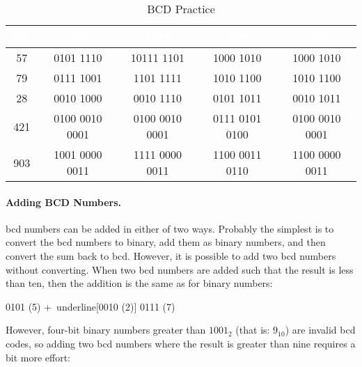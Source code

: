 \begin{table}[H]
  \sffamily
  \newcommand{\head}[1]{\textcolor{white}{\textbf{#1}}}    
  \begin{center}
    {\small         
      \begin{tabular}{ c c c c c } 
        \hline
        \rowcolor{black!75}
        {\head{Dec}} & {\head{8421}} & \head{2421} 
        & \head{Ex3} & \head{5421} \\
        \hline    
        57  & 0101 1110      & 10111 1101     
            & 1000 1010      & 1000 1010 \\
        79  & 0111 1001      & 1101 1111      
            & 1010 1100      & 1010 1100 \\
        
        28  & 0010 1000      & 0010 1110      
            & 0101 1011      & 0010 1011 \\
        421 & 0100 0010 0001 & 0100 0010 0001 
            & 0111 0101 0100 & 0100 0010 0001 \\
        
        903 & 1001 0000 0011 & 1111 0000 0011 
            & 1100 0011 0110 & 1100 0000 0011 \\
        \hline  
      \end{tabular}
    }  %
  \end{center}
  \caption{BCD Practice}
  \label{MO:tab:bcd_practice}
\end{table}

\paragraph{Adding BCD Numbers.} \gls{bcd} numbers can be added in either of two ways. Probably the simplest is to convert the \gls{bcd} numbers to binary, add them as binary numbers, and then convert the sum back to \gls{bcd}. However, it is possible to add two \gls{bcd} numbers without converting. When two \gls{bcd} numbers are added such that the result is less than ten, then the addition is the same as for binary numbers:

\begin{binDisp}[commandchars=~\[\]]
     0101  (5)
    +~underline[0010  (2)]
     0111  (7)
\end{binDisp}

However, four-bit binary numbers greater than $ 1001_2 $ (that is: $ 9_{10} $) are invalid \gls{bcd} codes, so adding two \gls{bcd} numbers where the result is greater than nine requires a bit more effort:

